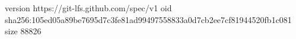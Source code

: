 version https://git-lfs.github.com/spec/v1
oid sha256:105ed05a89be7695d7c3fe81ad99497558833a0d7cb2ee7cf81944520fb1c081
size 88826
